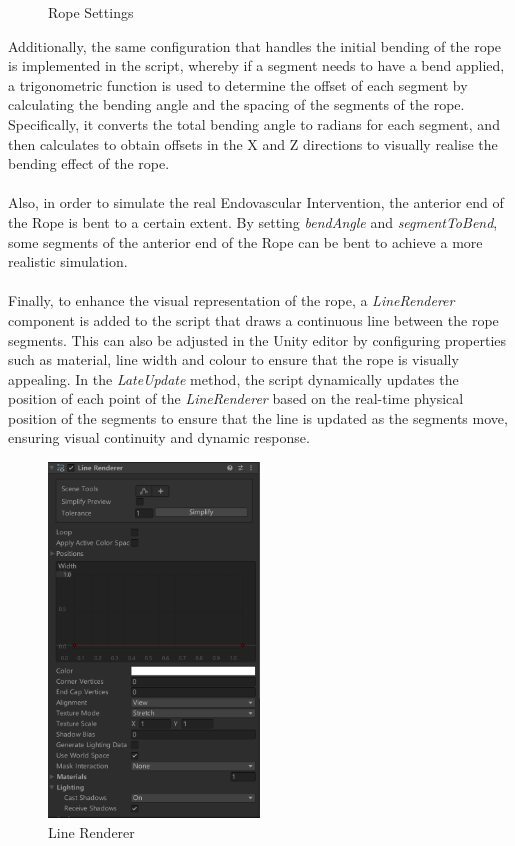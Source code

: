 \documentclass[12pt]{article}
\begin{document}
\begin{enumerate}
\begin{figure}[H]
            \caption{Rope Settings}
      \end{figure}
      Additionally, the same configuration that handles the initial bending of the rope is implemented in the script, whereby if a segment needs to have a bend applied, a trigonometric function is used to determine the offset of each segment by calculating the bending angle and the spacing of the segments of the rope. Specifically, it converts the total bending angle to radians for each segment, and then calculates to obtain offsets in the X and Z directions to visually realise the bending effect of the rope.
      \\\\
      Also, in order to simulate the real Endovascular Intervention, the anterior end of the Rope is bent to a certain extent. By setting \emph{bendAngle} and \emph{segmentToBend}, some segments of the anterior end of the Rope can be bent to achieve a more realistic simulation.
      \\\\
      Finally, to enhance the visual representation of the rope, a \emph{LineRenderer} component is added to the script that draws a continuous line between the rope segments. This can also be adjusted in the Unity editor by configuring properties such as material, line width and colour to ensure that the rope is visually appealing. In the \emph{LateUpdate } method, the script dynamically updates the position of each point of the \emph{LineRenderer} based on the real-time physical position of the segments to ensure that the line is updated as the segments move, ensuring visual continuity and dynamic response.
      \begin{figure}[H]
            \centering
            \includegraphics[width=0.5\textwidth]{render.png}
            \caption{Line Renderer}
      \end{figure}

\end{enumerate}
\end{document}
